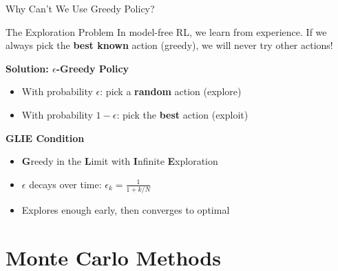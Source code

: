 \documentclass[aspectratio=169]{beamer}
\begin{document}
\begin{frame}{Why Can't We Use Greedy Policy?}
    \begin{block}{The Exploration Problem}
        In model-free RL, we learn from experience. If we always pick the \textbf{best known} action (greedy), we will never try other actions!
    \end{block}

    \vspace{0.3cm}

    \textbf{Solution: $\epsilon$-Greedy Policy}
    \begin{itemize}
        \item With probability $\epsilon$: pick a \textbf{random} action (explore)
        \item With probability $1-\epsilon$: pick the \textbf{best} action (exploit)
    \end{itemize}

    \vspace{0.3cm}

    \textbf{GLIE Condition}
    \begin{itemize}
        \item \textbf{G}reedy in the \textbf{L}imit with \textbf{I}nfinite \textbf{E}xploration
        \item $\epsilon$ decays over time: $\epsilon_k = \frac{1}{1 + k / N}$
        \item Explores enough early, then converges to optimal
    \end{itemize}
\end{frame}

\section{Monte Carlo Methods}
\end{document}
